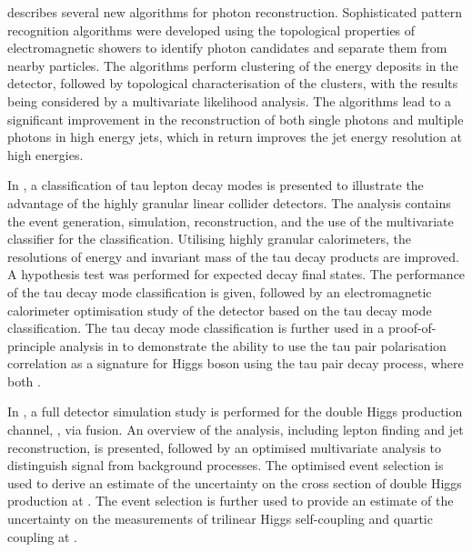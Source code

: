  describes several new \pandora algorithms for photon reconstruction. Sophisticated pattern recognition algorithms were developed using the topological properties of electromagnetic showers to identify photon candidates and separate them from nearby particles. The algorithms perform clustering of the energy deposits in the detector, followed by topological characterisation of the clusters, with the results being considered by a multivariate likelihood analysis. The algorithms lead to a significant improvement in the reconstruction of both single photons and multiple photons in high energy jets, which in return improves the jet energy resolution at high energies.



In , a classification of tau lepton decay modes is presented to illustrate the advantage of the highly granular linear collider detectors. The analysis contains the event generation, simulation, reconstruction, and the use of the multivariate classifier for the classification. Utilising highly granular calorimeters, the resolutions of energy and invariant mass of the tau decay products are improved. A hypothesis test was performed for expected decay final states.  The performance of the tau decay mode classification is given, followed by an electromagnetic calorimeter optimisation study of the \ILD detector based on the tau decay mode classification. The  tau decay mode classification is further used in a proof-of-principle analysis in  to demonstrate the ability to use the tau pair polarisation correlation as a signature for Higgs boson using the tau pair decay process, where both \tauToPionBoth.



In , a full \CLICILD detector simulation study is performed for the double Higgs production channel, \eeToHH, via \WW fusion. An overview of the analysis, including lepton finding and jet reconstruction, is presented, followed by an optimised multivariate analysis to distinguish signal from background processes. The optimised event selection is used to derive an estimate of the uncertainty on the cross section of double Higgs production at \CLIC. The event selection is further used to provide an estimate of the uncertainty on the measurements of  trilinear Higgs self-coupling and quartic coupling at \CLIC.

